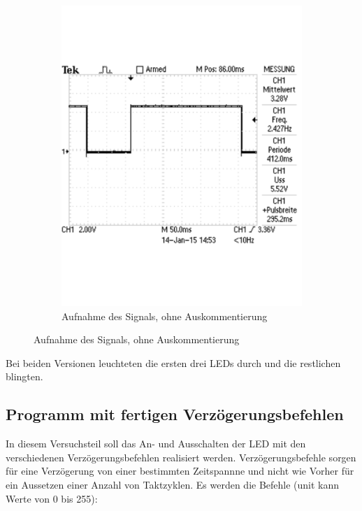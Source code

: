 \documentclass[12pt,a4paper]{article}
\begin{document}
\begin{figure}[H]
\begin{subfigure}[b]{0.45\textwidth}
   \includegraphics[trim = 0mm 50mm 0mm 50mm, clip, scale = 0.4]{TEK0004.pdf}
  \caption[Aufnahme des Signals, ohne Auskommentierung]{Aufnahme des Signals, ohne Auskommentierung} 
  \label{fig:g_4}
\end{subfigure}
\end{figure}

Bei beiden Versionen leuchteten die ersten drei LEDs durch und die restlichen blingten.

\subsection{Programm mit fertigen Verzögerungsbefehlen}

In diesem Versuchsteil soll das An- und Ausschalten der LED mit den verschiedenen Verzögerungsbefehlen realisiert werden. Verzögerungsbefehle sorgen für eine Verzögerung von einer bestimmten Zeitspannne und nicht wie Vorher für ein Aussetzen einer Anzahl von Taktzyklen. Es werden die Befehle (unit kann Werte von 0 bis 255):
\end{document}
